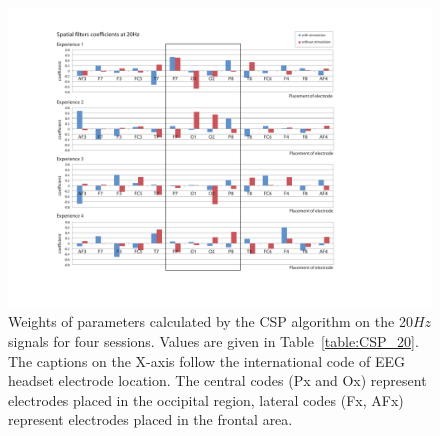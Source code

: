 \documentclass[smallextended]{svjour3}
\begin{document}
\begin{figure}
\center
\includegraphics[width = \textwidth] {figures/CSP-20Hz-all.pdf}
\caption{Weights of parameters calculated by the CSP algorithm on the 20$Hz$ signals for four sessions. Values are given in Table~\ref{table:CSP_20}. The captions on the X-axis follow the international code of EEG headset electrode location. The central codes (Px and Ox) represent electrodes placed in the occipital region, lateral codes (Fx, AFx) represent electrodes placed in the frontal area.} \label{fig:CSP_20}
\end{figure}
\end{document}
